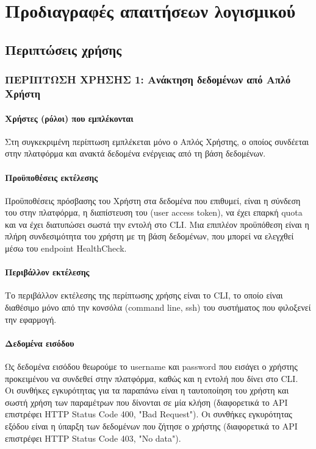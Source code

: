 \documentclass[a4paper,12pt, oneside]{article}
\begin{document}
\section{Προδιαγραφές απαιτήσεων λογισμικού} 
\subsection{Περιπτώσεις χρήσης}
\subsubsection{ΠΕΡΙΠΤΩΣΗ ΧΡΗΣΗΣ 1: Ανάκτηση δεδομένων από Απλό Χρήστη}
\paragraph{Χρήστες (ρόλοι) που εμπλέκονται}
Στη συγκεκριμένη περίπτωση εμπλέκεται μόνο ο Απλός Χρήστης, ο οποίος συνδέεται στην πλατφόρμα και ανακτά δεδομένα ενέργειας από τη βάση δεδομένων.
 
\paragraph{Προϋποθέσεις εκτέλεσης}
Προϋποθέσεις πρόσβασης του Χρήστη στα δεδομένα που επιθυμεί, είναι η σύνδεση του στην πλατφόρμα, η διαπίστευση του \textlatin{(user access token)}, να έχει επαρκή \textlatin{quota} και να έχει διατυπώσει σωστά την εντολή στο \textlatin{CLI}. Μια επιπλέον προϋπόθεση είναι η πλήρη συνδεσιμότητα του χρήστη με τη βάση δεδομένων, που μπορεί να ελεγχθεί μέσω  του \textlatin{endpoint HealthCheck}.

\paragraph{Περιβάλλον εκτέλεσης}
Το περιβάλλον εκτέλεσης της περίπτωσης χρήσης είναι το \textlatin{CLI}, το οποίο είναι διαθέσιμο μόνο από την κονσόλα \textlatin{(command line, ssh)} του συστήματος που φιλοξενεί την εφαρμογή.

\paragraph{Δεδομένα εισόδου}
Ως δεδομένα εισόδου θεωρούμε το  \textlatin{username} και  \textlatin{password} που εισάγει ο χρήστης προκειμένου να συνδεθεί στην πλατφόρμα, καθώς και η εντολή που δίνει στο  \textlatin{CLI}. \\
Οι συνθήκες εγκυρότητας για τα παραπάνω είναι η ταυτοποίηση του χρήστη και σωστή χρήση των παραμέτρων που  δίνονται σε μία κλήση (διαφορετικά  το  \textlatin{API} επιστρέφει  \textlatin{HTTP Status Code 400, "Bad Request").}
Οι συνθήκες εγκυρότητας εξόδου είναι η ύπαρξη των δεδομένων που ζήτησε ο χρήστης (διαφορετικά  το  \textlatin{API} επιστρέφει  \textlatin{HTTP Status Code 403, "No data").}
\end{document}
